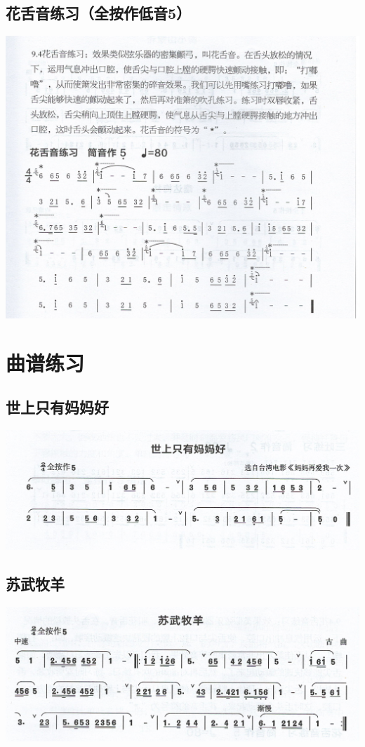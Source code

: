 \documentclass[cn,pad,chinese,chinesefont=nofont]{elegantbook}
\begin{document}
\section{花舌音练习（全按作低音5）}
\includegraphics[width=\textwidth]{dongxiao/Scan 16-2.jpeg}

\chapter{曲谱练习}
\section{世上只有妈妈好}
\includegraphics[width=\textwidth]{dongxiao/Scan 17-1.jpeg}
\section{苏武牧羊}
\includegraphics[width=\textwidth]{dongxiao/Scan 17-2.jpeg}
\end{document}
